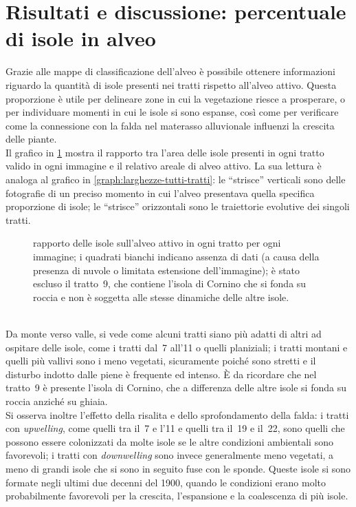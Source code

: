 \section{Risultati e discussione: percentuale di isole in alveo}
\label{sec:perc-isole-in-alveo}
Grazie alle mappe di classificazione dell'alveo è possibile ottenere informazioni riguardo la quantità di isole presenti nei tratti rispetto all'alveo attivo.
Questa proporzione è utile per delineare zone in cui la vegetazione riesce a prosperare, o per individuare momenti in cui le isole si sono espanse, così come per verificare come la connessione con la falda nel materasso alluvionale influenzi la crescita delle piante.
\\
Il grafico in \cref{graph:rapp-isl-tutti-tratti} mostra il rapporto tra l'area delle isole presenti in ogni tratto valido in ogni immagine e il relativo areale di alveo attivo.
La sua lettura è analoga al grafico in \cref{graph:larghezze-tutti-tratti}: le “strisce” verticali sono delle fotografie di un preciso momento in cui l'alveo presentava quella specifica proporzione di isole; le “strisce” orizzontali sono le traiettorie evolutive dei singoli tratti.
%
\begin{figure}
	\centering
	
	\caption[rapporto delle isole sull'alveo attivo in ogni tratto per ogni immagine]{rapporto delle isole sull'alveo attivo in ogni tratto per ogni immagine; i quadrati bianchi indicano assenza di dati (a causa della presenza di nuvole o limitata estensione dell'immagine); è stato escluso il tratto~9, che contiene l'isola di Cornino che si fonda su roccia e non è soggetta alle stesse dinamiche delle altre isole.}
	\label{graph:rapp-isl-tutti-tratti}
\end{figure}
%
\\
Da monte verso valle, si vede come alcuni tratti siano più adatti di altri ad ospitare delle isole, come i tratti dal~7 all'11 o quelli planiziali;
i tratti montani e quelli più vallivi sono i meno vegetati, sicuramente poiché sono stretti e il disturbo indotto dalle piene è frequente ed intenso.
È da ricordare che nel tratto~9 è presente l'isola di Cornino, che a differenza delle altre isole si fonda su roccia anziché su ghiaia.
\\
Si osserva inoltre l'effetto della risalita e dello sprofondamento della falda:
i tratti con \emph{upwelling}, come quelli tra il~7 e l'11 e quelli tra il~19 e il~22, sono quelli che possono essere colonizzati da molte isole se le altre condizioni ambientali sono favorevoli; i tratti con \emph{downwelling} sono invece generalmente meno vegetati, a meno di grandi isole che si sono in seguito fuse con le sponde. Queste isole si sono formate negli ultimi due decenni del 1900, quando le condizioni erano molto probabilmente favorevoli per la crescita, l'espansione e la coalescenza di più isole.
